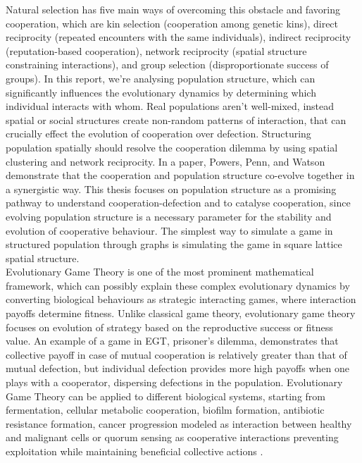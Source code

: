 \documentclass{article}
\begin{document}
Natural selection has five main ways of overcoming this obstacle and favoring cooperation, which are kin selection (cooperation among genetic kins), direct reciprocity (repeated encounters with the same individuals), indirect reciprocity (reputation-based cooperation), network reciprocity (spatial structure constraining interactions), and group selection (disproportionate success of groups).
In this report, we're analysing population structure, which can significantly influences the evolutionary dynamics by determining which individual interacts with whom. Real populations aren't well-mixed, instead spatial or social structures create non-random patterns of interaction, that can crucially effect the evolution of cooperation over defection. Structuring population spatially should resolve the cooperation dilemma by using spatial clustering and network reciprocity\citep{Nowak2010}. 
In a paper, Powers, Penn, and Watson demonstrate that the cooperation and population structure co-evolve together in a synergistic way\citep{Powers2011}.
This thesis focuses on population structure as a promising pathway to understand cooperation-defection and to catalyse cooperation, since evolving population structure is a necessary parameter for the stability and evolution of cooperative behaviour. The simplest way to simulate a game in structured population through graphs is simulating the game in square lattice spatial structure.\\
Evolutionary Game Theory is one of the most prominent mathematical framework, which can possibly explain these complex evolutionary dynamics by converting biological behaviours as strategic interacting games, where interaction payoffs determine fitness. Unlike classical game theory, evolutionary game theory focuses on evolution of strategy based on the reproductive success or fitness value. An example of a game in EGT, prisoner's dilemma, demonstrates that collective payoff in case of mutual cooperation is relatively greater than that of mutual defection, but individual defection provides more high payoffs when one plays with a cooperator, dispersing defections in the population.
Evolutionary Game Theory can be applied to different biological systems, starting from fermentation, cellular metabolic cooperation, biofilm formation, antibiotic resistance formation, cancer progression modeled as interaction between healthy and malignant cells or quorum sensing as cooperative interactions preventing exploitation while maintaining beneficial collective actions \citep{Hummert2014}.\\
\end{document}
